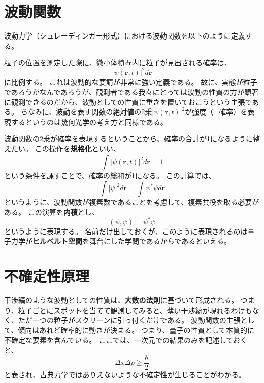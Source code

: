 \documentclass[a4paper]{jsreport}
\begin{document}
        \section{波動関数}
            波動力学（シュレーディンガー形式）における波動関数を以下のように定義する。\par
            粒子の位置を測定した際に、微小体積$d \boldsymbol{r}$内に粒子が見出される確率は、
            \begin{equation}
                |\psi(\boldsymbol{r}, t)|^2 d\boldsymbol{r}
            \end{equation}
            に比例する。
            これは波動的な要請が非常に強い定義である。
            故に、実態が粒子であろうがなんであろうが、観測者である我々にとっては波動の性質の方が顕著に観測できるのだから、波動としての性質に重きを置いておこうという主張である。
            ちなみに、波動を表す関数の絶対値の2乗$|\psi(\boldsymbol{r}, t)|^2$が強度（=確率）を表現するというのは幾何光学の考え方と同様である。\par
            波動関数の2乗が確率を表現するということから、確率の合計が1になるように整えたい。
            この操作を\textbf{規格化}といい、
            \begin{equation}
                \int |\psi(\boldsymbol{r}, t)|^2 d\boldsymbol{r} = 1
            \end{equation}
            という条件を課すことで、確率の総和が1になる。
            この計算では、
            \begin{equation}
                \int |\psi|^2 d\boldsymbol{r} = \int \psi^* \psi d\boldsymbol{r}
            \end{equation}
            というように、波動関数が複素数であることを考慮して、複素共役を取る必要がある。
            この演算を\textbf{内積}とし、
            \begin{equation}
                (\psi, \psi) = \psi^* \psi
            \end{equation}
            というように表現する。
            名前だけ出しておくが、このように表現されるのは量子力学が\textbf{ヒルベルト空間}を舞台にした学問であるからであるといえる。

        \section{不確定性原理}
            干渉縞のような波動としての性質は、\textbf{大数の法則}に基づいて形成される。
            つまり、粒子ごとにスポットを当てて観測してみると、薄い干渉縞が現れるわけもなく、ただ一つの粒子がスクリーンに引っ付くだけである。
            波動関数の主張として、傾向はあれど確率的に動きが決まる。
            つまり、量子の性質として本質的に不確定な要素を含んでいる。
            ここでは、一次元での結果のみを記述しておくと、
            \begin{equation}
                \Delta x \Delta p \geq \frac{\hbar}{2}
            \end{equation}
            と表され、古典力学ではありえないような不確定性が生じることがわかる。
\end{document}
